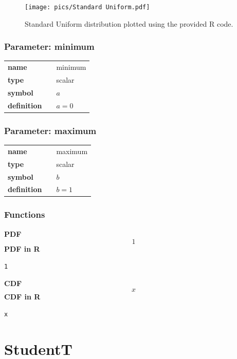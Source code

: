 \documentclass{article}
\begin{document}
\begin{figure}[ht!]
\centering
  \texttt{[image: pics/Standard Uniform.pdf]}
 \caption{Standard Uniform distribution plotted using the provided R code.}
 \label{fig:Standard Uniform}
\end{figure}

\subsubsection*{Parameter: minimum}

\noindent\begin{tabular}{p{2cm}cl}
\textbf{name} & & minimum \\
\textbf{type} & & scalar \\
\textbf{symbol} & & $a$  \\
\textbf{definition} & & $a=0$
\end{tabular}
\subsubsection*{Parameter: maximum}

\noindent\begin{tabular}{p{2cm}cl}
\textbf{name} & & maximum \\
\textbf{type} & & scalar \\
\textbf{symbol} & & $b$  \\
\textbf{definition} & & $b=1$
\end{tabular}
\subsubsection*{Functions}

\smallskip \noindent \hspace{.2cm} \textbf{PDF} 
\begin{equation*}1\end{equation*}
\smallskip \noindent \hspace{.2cm} \textbf{PDF in R}  
\begin{verbatim}1\end{verbatim}
\smallskip \noindent \hspace{.2cm} \textbf{CDF} 
\begin{equation*}x\end{equation*}
\smallskip \noindent \hspace{.2cm} \textbf{CDF in R} 
\begin{verbatim}x\end{verbatim}
\smallskip\section*{StudentT} 
\end{document}
